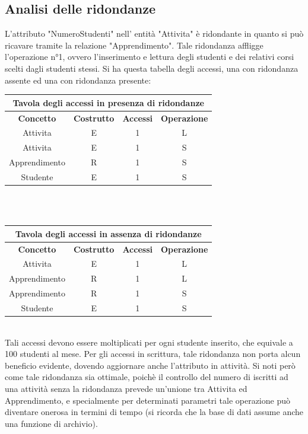 \documentclass[11pt]{article}
\begin{document}
	\subsection{Analisi delle ridondanze}
		L'attributo "NumeroStudenti" nell' entità "Attivita" è ridondante in quanto si può ricavare tramite la relazione "Apprendimento".
		Tale ridondanza affligge l'operazione n°1, ovvero l'inserimento e lettura degli studenti e dei relativi corsi scelti dagli studenti stessi. Si ha questa tabella degli accessi, una con ridondanza assente ed una con ridondanza presente:\\
		\begin{tabular}{|c|c|c|c|}
			\hline
			\multicolumn{4}{|c|}{Tavola degli accessi in presenza di ridondanze}\\
			\hline
			\textbf{Concetto} & \textbf{Costrutto} & \textbf{Accessi} &\textbf{Operazione}\\
			\hline
			Attivita&E&1&L\\
			\hline
			Attivita&E&1&S\\
			\hline
			Apprendimento&R&1&S\\
			\hline
			Studente&E&1&S\\
			\hline
		\end{tabular}\\\\
		\begin{tabular}{|c|c|c|c|}
			\hline
			\multicolumn{4}{|c|}{Tavola degli accessi in assenza di ridondanze}\\
			\hline
			\textbf{Concetto} & \textbf{Costrutto} & \textbf{Accessi} &\textbf{Operazione}\\
			\hline
			Attivita&E&1&L\\
			\hline
			Apprendimento&R&1&L\\
			\hline
			Apprendimento&R&1&S\\
			\hline
			Studente&E&1&S\\
			\hline
		\end{tabular}\\
		Tali accessi devono essere moltiplicati per ogni studente inserito, che equivale a 100 studenti al mese. Per gli accessi in scrittura, tale ridondanza non porta alcun beneficio evidente, dovendo aggiornare anche l'attributo in attività. Si noti però come tale ridondanza sia ottimale, poichè il controllo del numero di iscritti ad una attività senza la ridondanza prevede un'unione tra Attivita ed Apprendimento, e specialmente per determinati parametri tale operazione può diventare onerosa in termini di tempo (si ricorda che la base di dati assume anche una funzione di archivio).
\end{document}
